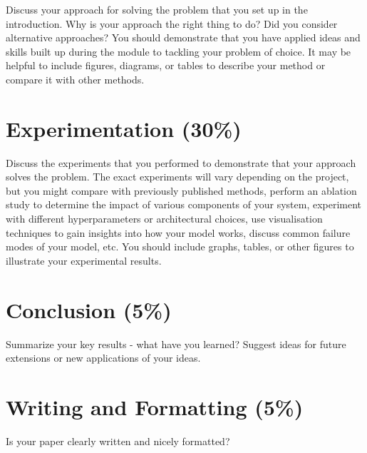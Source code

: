 \documentclass{article}
\begin{document}
Discuss your approach for solving the problem that you set up in the introduction. Why is your approach the right thing to do? Did you consider alternative approaches? You should demonstrate that you have applied ideas and skills built up during the module to tackling your problem of choice. It may be helpful to include figures, diagrams, or tables to describe your method or compare it with other methods.

\section{Experimentation (30\%)}

Discuss the experiments that you performed to demonstrate that your approach solves the problem. The exact experiments will vary depending on the project, but you might compare with previously published methods, perform an ablation study to determine the impact of various components of your system, experiment with different hyperparameters or architectural choices, use visualisation techniques to gain insights into how your model works, discuss common failure modes of your model, etc. You should include graphs, tables, or other figures to illustrate your experimental results.

\section{Conclusion (5\%)}

Summarize your key results - what have you learned? Suggest ideas for future extensions or new applications of your ideas.

\section{Writing and Formatting (5\%)}

Is your paper clearly written and nicely formatted? 
\end{document}
